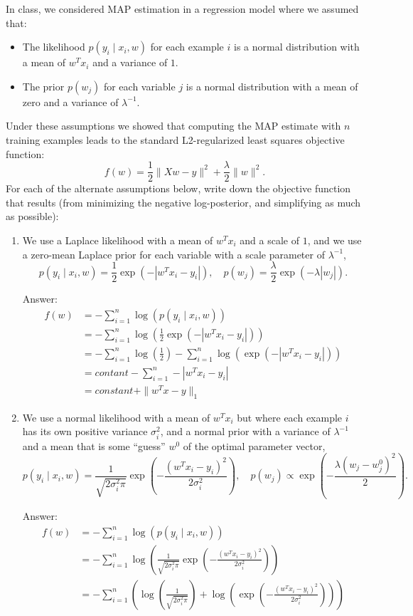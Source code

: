 \documentclass{article}
\def\ans#1{\par\gre{Answer: #1}}
\def\blu#1{{\color{blu}#1}}
\def\gre#1{{\color{gre}#1}}
\def\norm#1{\|#1\|}
\def\cond{\; | \;}
\def\items#1{\begin{itemize}#1\end{itemize}}
\def\enum#1{\begin{enumerate}#1\end{enumerate}}
\begin{document}
In class, we considered MAP estimation in a regression model where we assumed that:
\items{
\item The likelihood $p(y_i \cond x_i, w)$ for each example $i$ is a normal distribution with a mean of $w^Tx_i$ and a variance of $1$.
\item The prior $p(w_j)$ for each variable $j$ is a normal distribution with a mean of zero and a variance of $\lambda^{-1}$.
}
Under these assumptions we showed that computing the MAP estimate with $n$ training examples leads to the standard L2-regularized least squares objective function:
\[
f(w) = \frac{1}{2}\norm{Xw - y}^2 + \frac \lambda 2 \norm{w}^2.
\]
\blu{For each of the alternate assumptions below, write down the objective function that results} (from minimizing the negative log-posterior, and simplifying as much as possible):
\enum{
\item  We use a Laplace likelihood with a mean of $w^Tx_i$ and a scale of $1$, and we use a zero-mean Laplace prior for each variable with a scale parameter of $\lambda^{-1}$,
\[
p(y_i \cond x_i, w) = \frac 1 2 \exp(-|w^Tx_i - y_i|), \quad  p(w_j) = \frac{\lambda}{2}\exp(-\lambda|w_j|).
\]
\ans{
    \begin{align*}
    f(w) &= -\sum_{i=1}^n \log(p(y_i \cond x_i, w))\\
    &=- \sum_{i=1}^n \log(\frac 1 2 \exp(-|w^Tx_i - y_i|))\\
    &= - \sum_{i=1}^n \log(\frac 1 2) - \sum_{i=1}^n \log(\exp(-|w^Tx_i - y_i|)) \\
    &= contant - \sum_{i=1}^n -|w^Tx_i - y_i|\\
    & = constant + \|w^Tx - y\|_1
\end{align*}
}
\item We use a normal  likelihood with a mean of $w^Tx_i$ but where each example $i$ has its own  positive variance $\sigma_i^2$, and a normal prior with a variance of $\lambda^{-1}$ and a mean that is some ``guess'' $w^0$ of the optimal parameter vector,
\[
p(y_i \cond x_i,w) = \frac{1}{\sqrt{2\sigma_i^2\pi}}\exp\left(-\frac{(w^Tx_i - y_i)^2}{2\sigma_i^2}\right), \quad p(w_j) \propto \exp\left(-\frac{\lambda(w_j -  w^0_j)^2}{2}\right).
\]
\ans{
    \begin{align*}
        f(w) &= -\sum_{i=1}^n \log(p(y_i \cond x_i, w))\\
        & = -\sum_{i=1}^n \log(\frac{1}{\sqrt{2\sigma_i^2\pi}}\exp\left(-\frac{(w^Tx_i - y_i)^2}{2\sigma_i^2}\right)) \\
        & = -\sum_{i=1}^n (\log(\frac{1}{\sqrt{2\sigma_i^2\pi}}) + \log(\exp\left(-\frac{(w^Tx_i - y_i)^2}{2\sigma_i^2}\right)))\\

\end{align*}}}
\end{document}
